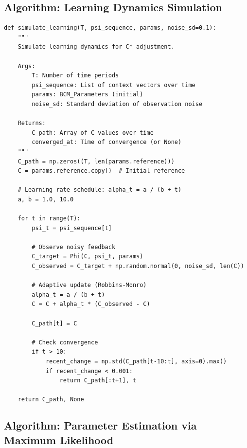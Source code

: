 \subsection{Algorithm: Learning Dynamics Simulation}

\begin{tcolorbox}[colback=gray!5!white, colframe=gray!75!black,
    title=Implementation AZ-S4: Adaptive Learning Simulation]
\begin{verbatim}
def simulate_learning(T, psi_sequence, params, noise_sd=0.1):
    """
    Simulate learning dynamics for C* adjustment.

    Args:
        T: Number of time periods
        psi_sequence: List of context vectors over time
        params: BCM_Parameters (initial)
        noise_sd: Standard deviation of observation noise

    Returns:
        C_path: Array of C values over time
        converged_at: Time of convergence (or None)
    """
    C_path = np.zeros((T, len(params.reference)))
    C = params.reference.copy()  # Initial reference

    # Learning rate schedule: alpha_t = a / (b + t)
    a, b = 1.0, 10.0

    for t in range(T):
        psi_t = psi_sequence[t]

        # Observe noisy feedback
        C_target = Phi(C, psi_t, params)
        C_observed = C_target + np.random.normal(0, noise_sd, len(C))

        # Adaptive update (Robbins-Monro)
        alpha_t = a / (b + t)
        C = C + alpha_t * (C_observed - C)

        C_path[t] = C

        # Check convergence
        if t > 10:
            recent_change = np.std(C_path[t-10:t], axis=0).max()
            if recent_change < 0.001:
                return C_path[:t+1], t

    return C_path, None
\end{verbatim}
\end{tcolorbox}

\subsection{Algorithm: Parameter Estimation via Maximum Likelihood}

